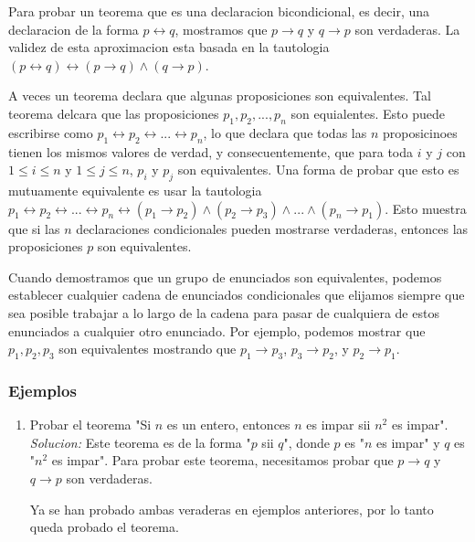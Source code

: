 \documentclass[]{article}
\begin{document}
Para probar un teorema que es una declaracion bicondicional, es decir, una declaracion de la forma $p \leftrightarrow q$, mostramos que $p \rightarrow q$ y $q \rightarrow p$ son verdaderas. La validez de esta aproximacion esta basada en la tautologia $(p \leftrightarrow q) \leftrightarrow (p \rightarrow q) \wedge (q \rightarrow p)$.

A veces un teorema declara que algunas proposiciones son equivalentes. Tal teorema delcara que las proposiciones $p_{1}, p_{2}, ..., p_{n}$ son equialentes. Esto puede escribirse como $p_{1} \leftrightarrow p_{2} \leftrightarrow ... \leftrightarrow p_{n}$, lo que declara que todas las $n$ proposicinoes tienen los mismos valores de verdad, y consecuentemente, que para toda $i$ y $j$ con $1 \leq i \leq n$ y $1 \leq j \leq n$, $p_{i}$ y $p_{j}$ son equivalentes. Una forma de probar que esto es mutuamente equivalente es usar la tautologia $p_{1} \leftrightarrow p_{2} \leftrightarrow ... \leftrightarrow p_{n} \leftrightarrow (p_{1} \rightarrow p_{2}) \wedge (p_{2} \rightarrow p_{3}) \wedge ... \wedge (p_{n} \rightarrow p_{1})$. Esto muestra que si las $n$ declaraciones condicionales pueden mostrarse verdaderas, entonces las proposiciones $p$ son equivalentes.

Cuando demostramos que un grupo de enunciados son equivalentes, podemos establecer cualquier cadena de enunciados condicionales que elijamos siempre que sea posible trabajar a lo largo de la cadena para pasar de cualquiera de estos enunciados a cualquier otro enunciado. Por ejemplo, podemos mostrar que $p_{1}, p_{2}, p_{3}$ son equivalentes mostrando que $p_{1} \rightarrow p_{3}$, $p_{3} \rightarrow p_{2}$, y $p_{2} \rightarrow p_{1}$.
\subsubsection*{Ejemplos}

\begin{enumerate}
	\item Probar el teorema "Si $n$ es un entero, entonces $n$ es impar sii $n^{2}$ es impar".
	\textit{Solucion:} Este teorema es de la forma "$p$ sii $q$", donde $p$ es "$n$ es impar" y $q$ es "$n^{2}$ es impar". Para probar este teorema, necesitamos probar que $p \rightarrow q$ y $q \rightarrow p$ son verdaderas.

	Ya se han probado ambas veraderas en ejemplos anteriores, por lo tanto queda probado el teorema.
\end{enumerate}
\end{document}
